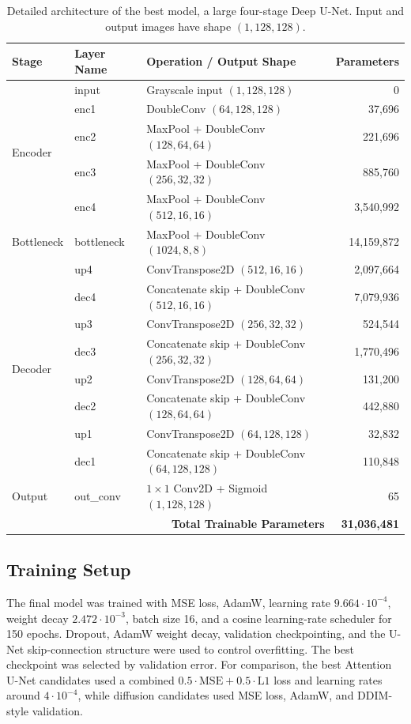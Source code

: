 \documentclass[a4paper,10pt]{article}
\begin{document}
\begin{table}[H]
\centering
\caption{Detailed architecture of the best model, a large four-stage Deep U-Net. Input and output images have shape $(1,128,128)$.}
\begin{tabular}{lllr}
\toprule
\textbf{Stage} & \textbf{Layer Name} & \textbf{Operation / Output Shape} & \textbf{Parameters} \\
\midrule
\multirow{5}{*}{Encoder}
& input & Grayscale input $(1,128,128)$ & 0 \\
& enc1 & DoubleConv $(64,128,128)$ & 37,696 \\
& enc2 & MaxPool + DoubleConv $(128,64,64)$ & 221,696 \\
& enc3 & MaxPool + DoubleConv $(256,32,32)$ & 885,760 \\
& enc4 & MaxPool + DoubleConv $(512,16,16)$ & 3,540,992 \\
\midrule
Bottleneck
& bottleneck & MaxPool + DoubleConv $(1024,8,8)$ & 14,159,872 \\
\midrule
\multirow{8}{*}{Decoder}
& up4 & ConvTranspose2D $(512,16,16)$ & 2,097,664 \\
& dec4 & Concatenate skip + DoubleConv $(512,16,16)$ & 7,079,936 \\
& up3 & ConvTranspose2D $(256,32,32)$ & 524,544 \\
& dec3 & Concatenate skip + DoubleConv $(256,32,32)$ & 1,770,496 \\
& up2 & ConvTranspose2D $(128,64,64)$ & 131,200 \\
& dec2 & Concatenate skip + DoubleConv $(128,64,64)$ & 442,880 \\
& up1 & ConvTranspose2D $(64,128,128)$ & 32,832 \\
& dec1 & Concatenate skip + DoubleConv $(64,128,128)$ & 110,848 \\
\midrule
Output
& out\_conv & $1\times1$ Conv2D + Sigmoid $(1,128,128)$ & 65 \\
\midrule
\multicolumn{3}{r}{\textbf{Total Trainable Parameters}} & \textbf{31,036,481} \\
\bottomrule
\end{tabular}
\end{table}

\subsection{Training Setup}
The final model was trained with MSE loss, AdamW, learning rate $9.664\cdot10^{-4}$, weight decay $2.472\cdot10^{-3}$, batch size 16, and a cosine learning-rate scheduler for 150 epochs. Dropout, AdamW weight decay, validation checkpointing, and the U-Net skip-connection structure were used to control overfitting. The best checkpoint was selected by validation error. For comparison, the best Attention U-Net candidates used a combined $0.5\cdot\mathrm{MSE}+0.5\cdot\mathrm{L1}$ loss and learning rates around $4\cdot10^{-4}$, while diffusion candidates used MSE loss, AdamW, and DDIM-style validation.
\end{document}
